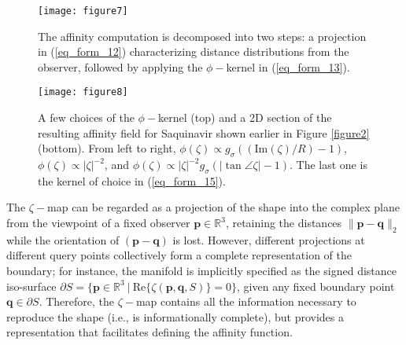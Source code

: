 \documentclass[article]{gmp2014}
\theoremstyle{definition}
\begin{document}
%
\begin{figure}
    \centering
    \texttt{[image: figure7]}
    \caption{The affinity computation is decomposed into two steps: a projection in (\ref{eq_form_12}) characterizing distance distributions from the observer, followed by applying the $\phi-$kernel in (\ref{eq_form_13}).} \label{figure7}
\end{figure}
%

%
\begin{figure}
    \centering
    \texttt{[image: figure8]}
    \caption{A few choices of the $\phi-$kernel (top) and a 2D section of the resulting affinity field for Saquinavir shown earlier in Figure \ref{figure2} (bottom). From left to right, $\phi(\zeta) \propto g_\sigma((\mathrm{Im}(\zeta)/R) - 1)$, $\phi(\zeta) \propto |\zeta|^{-2}$, and $\phi(\zeta) \propto |\zeta|^{-2} g_\sigma ( |\tan \angle \zeta| - 1)$. The last one is the kernel of choice in (\ref{eq_form_15}).} \label{figure8}
\end{figure}
%

The $\zeta-$map can be regarded as a projection of the shape into the complex plane from the viewpoint of a fixed observer $\mathbf{p} \in \mathds{R}^3$, retaining the distances $\|\mathbf{p} - \mathbf{q}\|_2$ while the orientation of $(\mathbf{p} - \mathbf{q})$ is lost. However, different projections at different query points collectively form a complete representation of the boundary; for instance, the manifold is implicitly specified as the signed distance iso-surface $\partial S = \{ \mathbf{p} \in \mathds{R}^3 ~|~ \mathrm{Re}\{\zeta(\mathbf{p}, \mathbf{q}, S)\} = 0 \}$, given any fixed boundary point $\mathbf{q} \in \partial S$.
%
Therefore, the $\zeta-$map contains all the information necessary to reproduce the shape (i.e., is informationally complete), but provides a representation that facilitates defining the affinity function.
\end{document}
